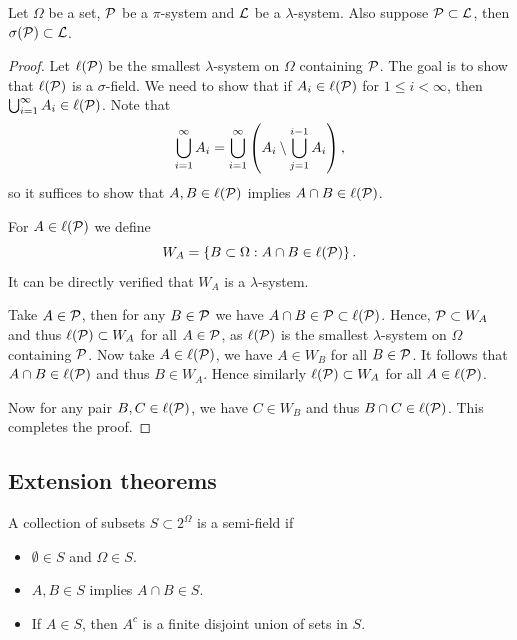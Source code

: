 \documentclass[a4paper]{article}
\begin{document}
\begin{thm}
  Let $\Omega$ be a set, $\P$ be a $\pi$-system and $\L$ be a $\lambda$-system.
  Also suppose $\P \subset \L$, then $\sigma (\P) \subset \L$.
\end{thm}

\begin{proof}
  Let $\ell (\P)$ be the smallest $\lambda$-system on $\Omega$ containing
  $\P$. The goal is to show that $\ell (\P)$ is a $\sigma$-field.
  We need to show that if $A_i \in \ell (\P)$ for $1 \leq i < \infty$,
  then $\cupinfi A_i \in \ell (\P)$. Note that
  \[
    \cupinfi A_i = \cupinfi \left( A_i \setminus \cupj^{i - 1} A_i \right),
  \]
  so it suffices to show that $A, B \in \ell (\P)$ implies $A \cap B \in
    \ell (\P)$.

  For $A \in \ell(\P)$ we define
  \[
    W_A = \left\{ B \subset \Omega : A \cap B \in \ell (\P) \right\}.
  \]
  It can be directly verified that $W_A$ is a $\lambda$-system.

  Take $A \in \P$, then for any $B \in \P$ we have $A \cap B \in \P
    \subset \ell (\P)$. Hence, $\P \subset W_A$ and thus $\ell (\P) \subset W_A$
  for all $A \in \P$, as $\ell (\P)$ is the smallest $\lambda$-system on
  $\Omega$ containing $\P$.
  Now take $A \in \ell (\P)$, we have $A \in W_B$
  for all $B \in \P$. It follows that $A \cap B \in \ell (\P)$ and thus
  $B \in W_A$. Hence similarly
  $\ell (\P) \subset W_A$ for all $A \in \ell (\P)$.

  Now for any pair $B, C \in \ell (\P)$, we have $C \in W_B$ and thus
  $B \cap C \in \ell (\P)$. This completes the proof.

\end{proof}

\subsection{Extension theorems}

\begin{defi}
  A collection of subsets $S \subset 2^{\Omega}$ is a semi-field if
  \begin{itemize}
    \item $\emptyset \in S$ and $\Omega \in S$.
    \item $A, B \in S$ implies $A \cap B \in S$.
    \item If $A \in S$, then $A^c$ is a finite disjoint union of sets in $S$.
  \end{itemize}
\end{defi}
\end{document}
